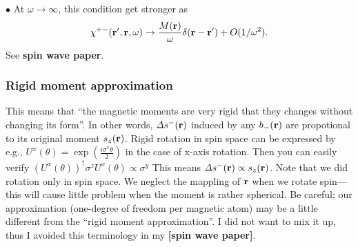 \documentclass[a4paper,10pt,epsf,fleqn]{article}
\newcommand{\bfr}{{\bf r}}
\newcommand{\ds}{\displaystyle}
\newcommand{\D}{{\it \Delta}}
\newcommand{\scgw}{QS{\it GW} }
\newcommand{\figs}[2]{\hspace{-2cm}\rotatebox{0}{\texttt{[image: \#1]}}\rotatebox{0}{\texttt{[image: \#2]}}}
\begin{document}
\noindent $\bullet$ At $\omega \to \infty$, this condition get stronger as
\begin{eqnarray}
\chi^{+-}(\bfr',\bfr,\omega) \to
\frac{M(\bfr)}{\omega} \delta(\bfr-\bfr') + O(1/\omega^2).
\label{summ2}
\end{eqnarray}
See {\bf spin wave paper}.


\subsubsection{Rigid moment approximation} 
This means that ``the magnetic moments are very rigid that they
changes without changing its form''. 
In other words, $\D s^-(\bfr)$ induced by any $b_-(\bfr)$ 
are propotional to its original moment $s_z(\bfr)$.
Rigid rotation in spin space can be expressed by e.g.,
$\ds U^x(\theta)=\exp\left( \frac{i \sigma^x \theta}{2}\right)$ in the case of x-axis rotation.
Then you can easily verify
$(U^x(\theta))^\dagger \sigma^z U^x(\theta) \propto \sigma^y$
This means $\D s^-(\bfr) \propto s_z(\bfr)$. 
Note that we did rotation only in spin space.
We neglect the mappling of $\bfr$ when we rotate spin---this will cause
little problem when the moment is rather spherical.
Be careful; our approximation (one-degree of freedom per magnetic atom) 
may be a little different from the ``rigid moment approximation''.
I did not want to mix it up, thus I avoided this terminology in my {\bf [spin wave paper]}.







\end{document}
